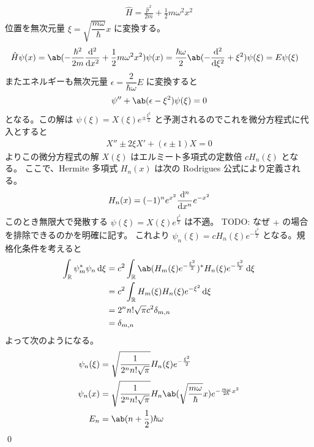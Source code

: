 \documentclass[uplatex,dvipdfmx,a4paper,11pt]{jlreq}
\makeatletter
\newcommand{\RR}{\mathbb{R}}
\numberwithin{equation}{section}
\theoremstyle{definition}
\renewenvironment{proof}[1][\proofname]{\par
  \normalfont
  \topsep6\p@\@plus6\p@ \trivlist
  \item[\hskip\labelsep{\bfseries #1}\@addpunct{\bfseries}]\ignorespaces\quad\par
}{%
  \qed\endtrivlist\@endpefalse
}
\renewcommand\proofname{証明}
\makeatother
\begin{document}
\begin{proof}
  \begin{align}
    \hat{H} = \frac{\hat{p}^2}{2m} + \frac{1}{2}m\omega^2x^2
  \end{align}
  位置を無次元量 $\xi = \sqrt{\dfrac{m\omega}{\hbar}}x$ に変換する。
  \begin{align}
    \hat{H}\psi(x) & = \ab(-\frac{\hbar^2}{2m}\dv[2]{x} + \frac{1}{2}m\omega^2x^2)\psi(x) = \frac{\hbar\omega}{2}\ab(-\dv[2]{\xi} + \xi^2)\psi(\xi) = E\psi(\xi)
  \end{align}
  またエネルギーも無次元量 $\epsilon = \dfrac{2}{\hbar\omega}E$ に変換すると
  \begin{align}
    \psi'' + \ab(\epsilon - \xi^2)\psi(\xi) = 0
  \end{align}
  となる。この解は $\psi(\xi) = X(\xi)e^{\pm\frac{\xi^2}{2}}$ と予測されるのでこれを微分方程式に代入とすると
  \begin{align}
    X'' \pm 2\xi X' + (\epsilon\pm 1)X = 0
  \end{align}
  よりこの微分方程式の解 $X(\xi)$ はエルミート多項式の定数倍 $cH_n(\xi)$ となる。
  ここで、Hermite 多項式 $H_n(x)$ は次の Rodrigues 公式により定義される。
  \begin{align}
    H_n(x) = (-1)^ne^{x^2}\dv[n]{x}e^{-x^2}
  \end{align}
  このとき無限大で発散する $\psi(\xi) = X(\xi)e^{\frac{\xi^2}{2}}$ は不適。
  TODO: なぜ $+$ の場合を排除できるのかを明確に記す。
  これより $\psi_n(\xi) = cH_n(\xi)e^{-\frac{\xi^2}{2}}$ となる。規格化条件を考えると
  \begin{align}
    \int_\RR \psi_m^*\psi_n\dl{\xi} & = c^2\int_\RR \ab(H_m(\xi)e^{-\frac{\xi^2}{2}})^*H_n(\xi)e^{-\frac{\xi^2}{2}}\dl{\xi} \\
                                    & = c^2\int_\RR H_m(\xi)H_n(\xi)e^{-\xi^2}\dl{\xi}                                      \\
                                    & = 2^nn!\sqrt{\pi}c^2\delta_{m, n}                                                     \\
                                    & = \delta_{m, n}
  \end{align}
  よって次のようになる。
  \begin{align}
    \psi_n(\xi) & = \sqrt{\frac{1}{2^nn!\sqrt{\pi}}}H_n(\xi)e^{-\frac{\xi^2}{2}}                                        \\
    \psi_n(x)   & = \sqrt{\frac{1}{2^nn!\sqrt{\pi}}}H_n\ab(\sqrt{\frac{m\omega}{\hbar}}x)e^{-\frac{m\omega}{2\hbar}x^2} \\
    E_n         & = \ab(n + \frac{1}{2})\hbar\omega
  \end{align}
\end{proof}
\end{document}
